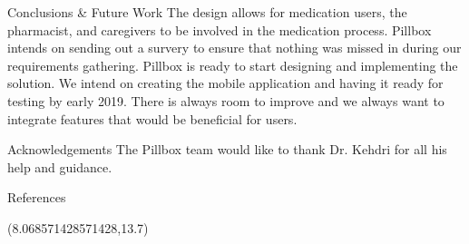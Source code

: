 \documentclass[22pt]{beamer}
\begin{document}
\begin{frame}[fragile]
\begin{textblock}{7.25}
\begin{block}{Conclusions \& Future Work}
The design allows for medication users, the pharmacist, and caregivers to be involved in the medication process. Pillbox intends on sending out a survery to ensure that nothing was missed in during our requirements gathering. Pillbox is ready to start designing and implementing the solution. We intend on creating the mobile application and having it ready for testing by early 2019. There is always room to improve and we always want to integrate features that would be beneficial for users.

\end{block}

\begin{block}{Acknowledgements}
The Pillbox team would like to thank Dr. Kehdri for all his help and guidance.
\end{block}

\begin{block}{References}

{\scriptsize
}
\end{block}

\end{textblock}


\begin{textblock}{2}(8.068571428571428,13.7)

\end{textblock}

\end{frame}
\end{document}
